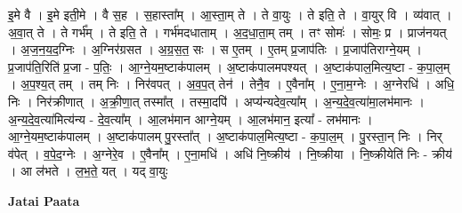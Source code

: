 \documentclass[17pt]{extarticle}
\begin{document}
इ॒मे वै । इ॒मे इती॒मे । वै स॒ह । स॒हास्ता᳚म् । आ॒स्ता॒म् ते । ते वा॒युः । ते इति॒ ते । वा॒युर् वि । व्य॑वात् । अ॒वा॒त् ते । ते गर्भ᳚म् । ते इति॒ ते । गर्भ॑मदधाताम् । अ॒द॒धा॒ता॒म् तम् । तꣳ सोमः॑ । सोमः॒ प्र । प्राज॑नयत् । अ॒ज॒न॒य॒द॒ग्निः । अ॒ग्निर॑ग्रसत । अ॒ग्र॒स॒त॒ सः । स ए॒तम् । ए॒तम् प्र॒जाप॑तिः । प्र॒जाप॑तिराग्ने॒यम् । प्र॒जाप॑ति॒रिति॑ प्र॒जा - प॒तिः॒ । आ॒ग्ने॒यम॒ष्टाक॑पालम् । अ॒ष्टाक॑पालमपश्यत् । अ॒ष्टाक॑पाल॒मित्य॒ष्टा - क॒पा॒ल॒म् । अ॒प॒श्य॒त् तम् । तम् निः । निर॑वपत् । अ॒व॒प॒त् तेन॑ । तेनै॒व । ए॒वैना᳚म् । ए॒॒ना॒म॒ग्नेः । अ॒ग्नेरधि॑ । अधि॒ निः । निर॑क्रीणात् । अ॒क्री॒णा॒त् तस्मा᳚त् । तस्मा॒दपि॑ । अप्य॑न्यदेव॒त्या᳚म् । अ॒न्य॒दे॒व॒त्या॑मा॒लभ॑मानः । अ॒न्य॒दे॒व॒त्या॑मित्य॑न्य - दे॒व॒त्या᳚म् । आ॒लभ॑मान आग्ने॒यम् । आ॒लभ॑मान॒ इत्या᳚ - लभ॑मानः । आ॒ग्ने॒यम॒ष्टाक॑पालम् । अ॒ष्टाक॑पालम् पु॒रस्ता᳚त् । अ॒ष्टाक॑पाल॒मित्य॒ष्टा - क॒पा॒ल॒म् । पु॒रस्ता॒न् निः । निर् व॑पेत् । व॒पे॒द॒ग्नेः । अ॒ग्नेरे॒व । ए॒वैना᳚म् । ए॒ना॒मधि॑ । अधि॑ नि॒ष्क्रीय॑ । नि॒ष्क्रीया । नि॒ष्क्रीयेति॑ निः - क्रीय॑ । आ ल॑भते । ल॒भ॒ते॒ यत् । यद् वा॒युः \newline

\textbf{Jatai Paata} \newline
\end{document}
